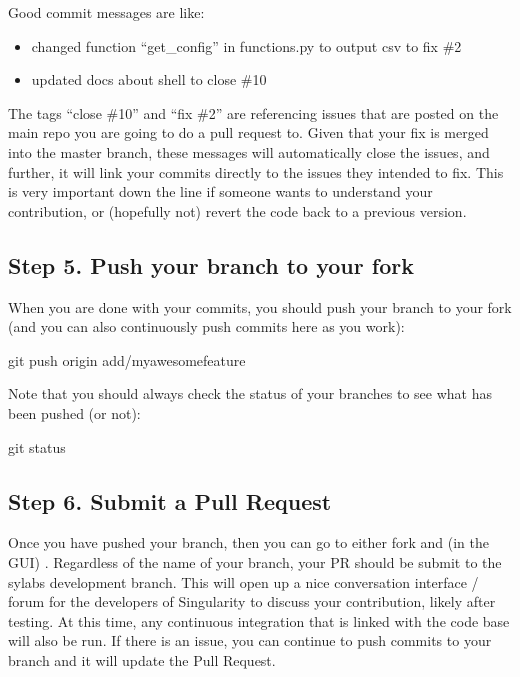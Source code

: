 \documentclass[letterpaper,10pt,english]{sphinxmanual}
\begin{document}
Good commit messages are like:
\begin{itemize}
\item {} 
changed function “get\_config” in functions.py to output csv to fix \#2

\item {} 
updated docs about shell to close \#10

\end{itemize}

The tags “close \#10” and “fix \#2” are referencing issues that are posted on the main repo you are going to do a pull request to. Given that your fix is merged into the master branch, these messages will automatically close the issues, and further, it will link your commits directly to the issues they intended to fix. This is very important down the line if someone wants to understand your contribution, or (hopefully not) revert the code back to a previous version.


\subsection{Step 5. Push your branch to your fork}
\label{\detokenize{contributing:step-5-push-your-branch-to-your-fork}}
When you are done with your commits, you should push your branch to your fork (and you can also continuously push commits here as you work):

%
\begin{sphinxVerbatim}[commandchars=\\\{\}]
git push origin add/my\PYGZhy{}awesome\PYGZhy{}feature
\end{sphinxVerbatim}

Note that you should always check the status of your branches to see what has been pushed (or not):

%
\begin{sphinxVerbatim}[commandchars=\\\{\}]
git status
\end{sphinxVerbatim}


\subsection{Step 6. Submit a Pull Request}
\label{\detokenize{contributing:step-6-submit-a-pull-request}}
Once you have pushed your branch, then you can go to either fork and (in the GUI) . Regardless of the name of your branch, your PR should be submit to the sylabs development branch. This will open up a nice conversation interface / forum for the developers of Singularity to discuss your contribution, likely after testing. At this time, any continuous integration that is linked with the code base will also be run. If there is an issue, you can continue to push commits to your branch and it will update the Pull Request.
\end{document}
